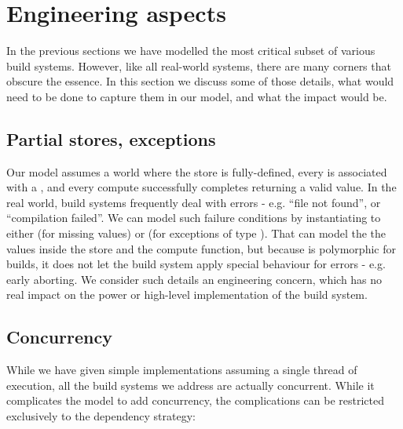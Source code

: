 \clearpage
\section{Engineering aspects}\label{sec-engineering}

In the previous sections we have modelled the most critical subset of various build systems. However, like all real-world systems, there are many corners that obscure the essence. In this section we discuss some of those details, what would need to be done to capture them in our model, and what the impact would be.

\subsection{Partial stores, exceptions}

Our model assumes a world where the store is fully-defined, every  is associated with a , and every compute successfully completes returning a valid value. In the real world, build systems frequently deal with errors - e.g. ``file not found'', or ``compilation failed''. We can model such failure conditions by instantiating  to either  (for missing values) or  (for exceptions of type ). That can model the the values inside the store and the compute function, but because  is polymorphic for builds, it does not let the build system apply special behaviour for errors - e.g. early aborting. We consider such details an engineering concern, which has no real impact on the power or high-level implementation of the build system.

\subsection{Concurrency}\label{sec-concurrency}

While we have given simple implementations assuming a single thread of execution, all the build systems we address are actually concurrent. While it complicates the model to add concurrency, the complications can be restricted exclusively to the dependency strategy:

